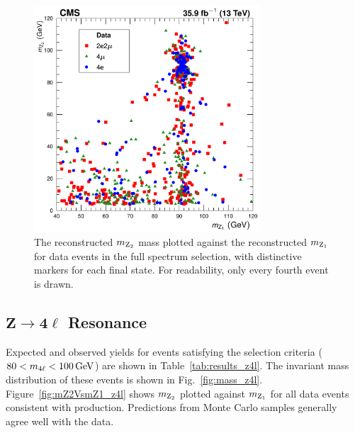\begin{figure}[htbp]
  \begin{center}
    \includegraphics[width=0.75\textwidth]{results/mZ2VsmZ1_full.pdf}
    \caption[Scatter plot of $m_{\PZ_2}$ vs.\ $m_{\PZ_1}$ for data events in the full spectrum selection]{
        The reconstructed $m_{\PZ_2}$ mass plotted against the reconstructed $m_{\PZ_1}$ for data events in the full spectrum selection, with distinctive markers for each final state.
        For readability, only every fourth event is drawn.
      }\label{fig:mZ2VsmZ1_full}
  \end{center}
\end{figure}


\subsection[\texorpdfstring{$\mathrm{Z} \to 4\ell$}{Z to 4l} Resonance]{$\mathbf{Z} \to \mathbf{4\ell}$ Resonance}

Expected and observed yields for events satisfying the {\Zfourl} selection criteria ($80 < m_{4\ell} < 100\,\mathrm{Ge\hspace{-.08em}V}$) are shown in Table~\ref{tab:results_z4l}.
The invariant mass distribution of these events is shown in Fig.~\ref{fig:mass_z4l}.
Figure~\ref{fig:mZ2VsmZ1_z4l} shows $m_{\PZ_2}$ plotted against $m_{\PZ_1}$ for all data events consistent with {\Zfourl} production.
Predictions from Monte Carlo samples generally agree well with the data.

